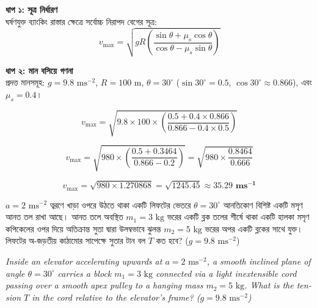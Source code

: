 \documentclass[12pt, a4paper]{article}
\begin{document}
\begin{tcolorbox}[solutionbox={সমাধান (Solution)}]
\noindent
\textbf{ধাপ ১: সূত্র নির্ধারণ} \\
ঘর্ষণযুক্ত ব্যাংকিং রাস্তার ক্ষেত্রে সর্বোচ্চ নিরাপদ বেগের সূত্র:
\[v_{\text{max}} = \sqrt{g R \left(\frac{\sin\theta + \mu_s \cos\theta}{\cos\theta - \mu_s \sin\theta}\right)}\]

\vspace{0.5em}
\noindent\textbf{ধাপ ২: মান বসিয়ে গণনা} \\
প্রদত্ত মানসমূহ: $g = 9.8\text{ ms}^{-2}$, $R = 100\text{ m}$, $\theta = 30^\circ$ ($\sin 30^\circ = 0.5$, $\cos 30^\circ \approx 0.866$), এবং $\mu_s = 0.4$।

\[v_{\text{max}} = \sqrt{9.8 \times 100 \times \left(\frac{0.5 + 0.4 \times 0.866}{0.866 - 0.4 \times 0.5}\right)}\]

\[v_{\text{max}} = \sqrt{980 \times \left(\frac{0.5 + 0.3464}{0.866 - 0.2}\right)} = \sqrt{980 \times \frac{0.8464}{0.666}}\]

\[v_{\text{max}} = \sqrt{980 \times 1.270868} = \sqrt{1245.45} \approx \mathbf{35.29\text{ ms}^{-1}}\]
\end{tcolorbox}

\begin{tcolorbox}[questionbox={প্রশ্ন (Question) 3}]
\noindent
$a = 2\text{ ms}^{-2}$ ত্বরণে খাড়া ওপরে উঠতে থাকা একটি লিফটের ভেতরে $\theta = 30^\circ$ আনতিকোণ বিশিষ্ট একটি মসৃণ আনত তল রাখা আছে। আনত তলে অবস্থিত $m_1 = 3\text{ kg}$ ভরের একটি ব্লক তলের শীর্ষে থাকা একটি হালকা মসৃণ কপিকেলের ওপর দিয়ে অতিক্রান্ত সুতা দ্বারা উলম্বভাবে ঝুলন্ত $m_2 = 5\text{ kg}$ ভরের অপর একটি ব্লকের সাথে যুক্ত। লিফটের অ-জড়তীয় কাঠামোর সাপেক্ষে সুতার টান বল $T$ কত হবে? ($g = 9.8\text{ ms}^{-2}$)
\vspace{0.8em}
\begin{english}
\noindent\textit{\color{darkgray}
Inside an elevator accelerating upwards at $a = 2\text{ ms}^{-2}$, a smooth inclined plane of angle $\theta = 30^\circ$ carries a block $m_1 = 3\text{ kg}$ connected via a light inextensible cord passing over a smooth apex pulley to a hanging mass $m_2 = 5\text{ kg}$. What is the tension $T$ in the cord relative to the elevator's frame? ($g = 9.8\text{ ms}^{-2}$)
}
\end{english}
\end{tcolorbox}
\end{document}
